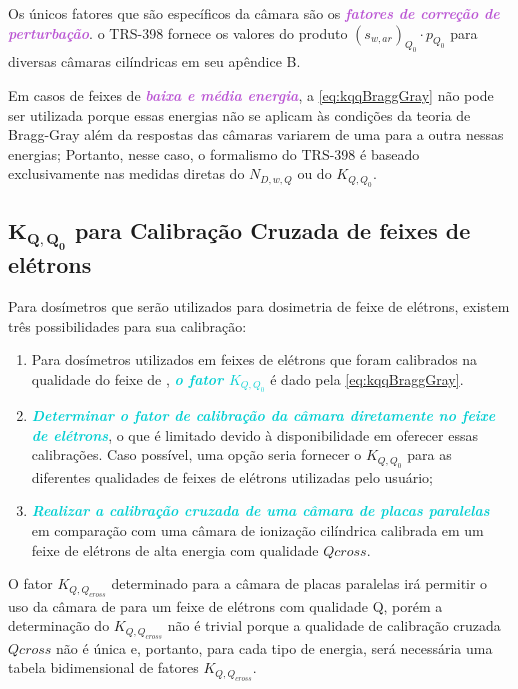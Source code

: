 \documentclass[11pt,a4paper]{article}
\begin{document}
		Os únicos fatores que são específicos da câmara são os \textcolor{MediumOrchid}{\textit{\textbf{fatores de correção de perturbação}}}. o TRS-398 fornece os valores do produto $(s_{w,ar})_{Q_0} \cdot p_{Q_0}$ para diversas câmaras cilíndricas em seu apêndice B.

		Em casos de feixes de \textcolor{MediumOrchid}{\textit{\textbf{baixa e média energia}}}, a \ref{eq:kqqBraggGray} não pode ser utilizada porque essas energias não se aplicam às condições da teoria de Bragg-Gray além da respostas das câmaras variarem de uma para a outra nessas energias; Portanto, nesse caso, o formalismo do TRS-398 é baseado exclusivamente nas medidas diretas do $N_{D,w,Q}$ ou do $K_{Q,Q_0}$.

	\subsection*{$\mathbf{K_{Q,Q_0}}$ para Calibração Cruzada de feixes de elétrons}

		Para dosímetros que serão utilizados para dosimetria de feixe de elétrons, existem três possibilidades para sua calibração:

		\begin{enumerate}
			\item Para dosímetros utilizados em feixes de elétrons que foram calibrados na qualidade do feixe de , \textcolor{DarkTurquoise}{\textit{\textbf{o fator $K_{Q,Q_0}$}}} é dado pela \ref{eq:kqqBraggGray}. 
			
			\item \textcolor{DarkTurquoise}{\textit{\textbf{Determinar o fator de calibração da câmara diretamente no feixe de elétrons}}}, o que é limitado devido à disponibilidade em oferecer essas calibrações. Caso possível, uma opção seria fornecer o $K_{Q,Q_0}$ para as diferentes qualidades de feixes de elétrons utilizadas pelo usuário;
			
			\item \textcolor{DarkTurquoise}{\textit{\textbf{Realizar a calibração cruzada de uma câmara de placas paralelas}}} em comparação com uma câmara de ionização cilíndrica calibrada em um feixe de elétrons de alta energia com qualidade $Q{cross}$. 
		\end{enumerate}

		O fator $K_{Q,Q_{cross}}$ determinado para a câmara de placas paralelas irá permitir o uso da câmara de para um feixe de elétrons com qualidade Q, porém a determinação do $K_{Q,Q_{cross}}$ não é trivial porque a qualidade de calibração cruzada $Q{cross}$ não é única e, portanto, para cada tipo de energia, será necessária uma tabela bidimensional de fatores $K_{Q,Q_{cross}}$.
\end{document}
